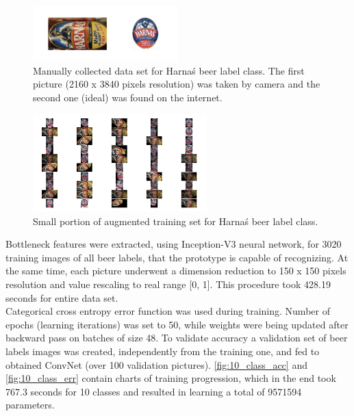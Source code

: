\documentclass[11pt]{article}
\begin{document}
\begin{figure}[h]
\includegraphics[width=0.5\textwidth]{collected_labels}
\centering
\caption{Manually collected data set for \foreignlanguage{polish}{Harnaś} beer label class. The first picture (2160 x 3840 pixels resolution) was taken by camera and the second one (ideal) was found on the internet.}
\label{fig:collected_labels}
\end{figure}

\begin{figure}[h]
\includegraphics[width=0.6\textwidth]{augm_subset}
\centering
\caption{Small portion of augmented training set for \foreignlanguage{polish}{Harnaś} beer label class.}
\label{fig:augm_subset}
\end{figure}

Bottleneck features were extracted, using Inception-V3 neural network, for 3020 training images of all beer labels, that the prototype is capable of recognizing. At the same time, each picture underwent a dimension reduction to 150 x 150 pixels resolution and value rescaling to real range [0, 1]. This procedure took 428.19 seconds for entire data set.\\

Categorical cross entropy error function was used during training. Number of epochs (learning iterations) was set to 50, while weights were being updated after backward pass on batches of size 48. To validate accuracy a validation set of beer labels images was created, independently from the training one, and fed to obtained ConvNet (over 100 validation pictures). \autoref{fig:10_class_acc} and \ref{fig:10_class_err} contain charts of training progression, which in the end took 767.3 seconds for 10 classes and resulted in learning a total of 9571594 parameters.
\end{document}
